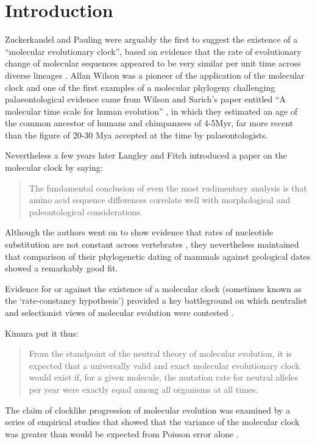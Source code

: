 \section{Introduction} 
Zuckerkandel and Pauling were arguably the first to suggest the existence of a ``molecular evolutionary clock'', based on evidence that the rate of evolutionary change of molecular sequences appeared to be very similar per unit time across diverse lineages \cite{zuckerkandl1965}. Allan Wilson was a pioneer of the application of the molecular clock and one of the first examples of a molecular phylogeny challenging palaeontological evidence came from Wilson and Sarich's paper entitled ``A molecular time scale for human evolution'' \cite{WilsonSarich1969}, in which they estimated an age of the common ancestor of humans and chimpanzees of 4-5Myr, far more recent than the figure of 20-30 Mya accepted at the time by palaeontologists.

Nevertheless a few years later Langley and Fitch \cite{LangleyFitch1974} introduced a paper on the molecular clock by saying:

\begin{quotation}
The fundamental conclusion of even the most rudimentary analysis is that amino acid sequence differences correlate well with morphological and paleontological considerations.
\end{quotation}

Although the authors went on to show evidence that rates of nucleotide substitution are not constant across vertebrates \cite{LangleyFitch1974}, they nevertheless maintained that comparison of their phylogenetic dating of mammals against geological dates showed a remarkably good fit. 

Evidence for or against the existence of a molecular clock (sometimes known as the `rate-constancy hypothesis') provided a key battleground on which neutralist and selectionist views of molecular evolution were contested \cite{Kimura1987}.

Kimura \cite{Kimura1987} put it thus:

\begin{quotation}
From the standpoint of the neutral theory of molecular evolution, it is expected that a universally valid and exact molecular evolutionary clock would exist if, for a given molecule, the mutation rate for neutral alleles per year were exactly equal among all organisms at all times.
\end{quotation}
 
The claim of clocklike progression of molecular evolution was examined by a series of empirical studies that showed that the variance of the molecular clock was greater than would be expected from Poisson error alone \cite{LangleyFitch1974}.

  
  
  
  
  
  
  
  
  
  
  
  
  
  
  
  
  
  
  
  
  
  
  